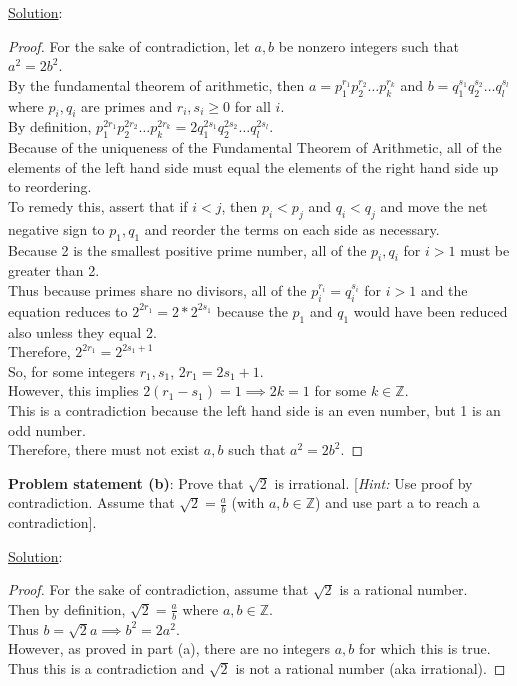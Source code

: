 \documentclass{article} %
\begin{document}
\underline{Solution}: 
\begin{addmargin}[1em]{0em}
\begin{proof}
For the sake of contradiction, let $a, b$ be nonzero integers such that $a^2 = 2b^2$.
\\By the fundamental theorem of arithmetic, then $a = p_1^{r_1}p_2^{r_2} \ldots p_k^{r_k}$ and $b = q_1^{s_1}q_2^{s_2} \ldots q_l^{s_l}$ where $p_i, q_i$ are primes and $r_i, s_i \geq 0$ for all $i$.
\\By definition, $p_1^{2r_1}p_2^{2r_2} \ldots p_k^{2r_k} = 2q_1^{2s_1}q_2^{2s_2} \ldots q_l^{2s_l}$.
\\Because of the uniqueness of the Fundamental Theorem of Arithmetic, all of the elements of the left hand side must equal the elements of the right hand side up to reordering.
\\To remedy this, assert that if $i < j$, then $p_i < p_j$ and $q_i <  q_j$ and move the net negative sign to $p_1, q_1$ and reorder the terms on each side as necessary.
\\Because 2 is the smallest positive prime number, all of the $p_i, q_i$ for $i > 1$ must be greater than 2.
\\Thus because primes share no divisors, all of the $p_i^{r_i} = q_i^{s_i}$ for $i > 1$ and the equation reduces to $2^{2r_1} = 2*2^{2s_1}$ because the $p_1$ and $q_1$ would have been reduced also unless they equal 2.
\\Therefore, $2^{2r_1} = 2^{2s_1 + 1}$
\\So, for some integers $r_1, s_1$, $2r_1 = 2s_1 + 1$.
\\However, this implies $2(r_1 - s_1) = 1 \implies 2k = 1$ for some $k \in \mathbb{Z}$.
\\This is a contradiction because the left hand side is an even number, but 1 is an odd number.
\\Therefore, there must not exist $a, b$ such that $a^2 = 2b^2$.
\end{proof}
\end{addmargin}

\hfill \break 

\textbf{Problem statement (b)}:  Prove that $\sqrt{2}$ is irrational.  [\textit{Hint:} Use proof by contradiction.  Assume that $\sqrt{2} = \frac{a}{b}$ (with $a,b \in \mathbb{Z}$) and use part {a} to reach a contradiction].

\underline{Solution}: 
\begin{addmargin}[1em]{0em}
\begin{proof}
For the sake of contradiction, assume that $\sqrt{2}$ is a rational number.
\\Then by definition, $\sqrt{2} = \frac{a}{b}$ where $a,b \in \mathbb{Z}$.
\\Thus $b = \sqrt{2}a \implies b^2 = 2a^2$.
\\However, as proved in part (a), there are no integers $a, b$ for which this is true.
\\Thus this is a contradiction and $\sqrt{2}$ is not a rational number (aka irrational).
\end{proof}
\end{addmargin}

\newpage
\end{document}
